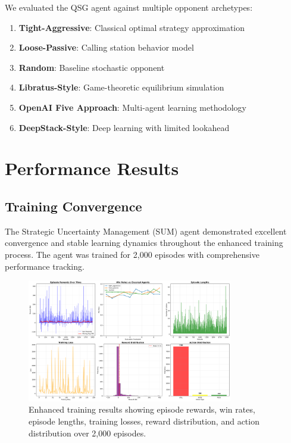 \documentclass[11pt,a4paper]{article}
\begin{document}
We evaluated the QSG agent against multiple opponent archetypes:

\begin{enumerate}
\item \textbf{Tight-Aggressive}: Classical optimal strategy approximation
\item \textbf{Loose-Passive}: Calling station behavior model
\item \textbf{Random}: Baseline stochastic opponent
\item \textbf{Libratus-Style}: Game-theoretic equilibrium simulation
\item \textbf{OpenAI Five Approach}: Multi-agent learning methodology
\item \textbf{DeepStack-Style}: Deep learning with limited lookahead
\end{enumerate}

\section{Performance Results}

\subsection{Training Convergence}

The Strategic Uncertainty Management (SUM) agent demonstrated excellent convergence and stable learning dynamics throughout the enhanced training process. The agent was trained for 2,000 episodes with comprehensive performance tracking.

\begin{figure}[h]
\centering
\includegraphics[width=0.8\textwidth]{../plots/enhanced_training_results_20250910_013942.png}
\caption{Enhanced training results showing episode rewards, win rates, episode lengths, training losses, reward distribution, and action distribution over 2,000 episodes.}
\label{fig:training_convergence}
\end{figure}
\end{document}
